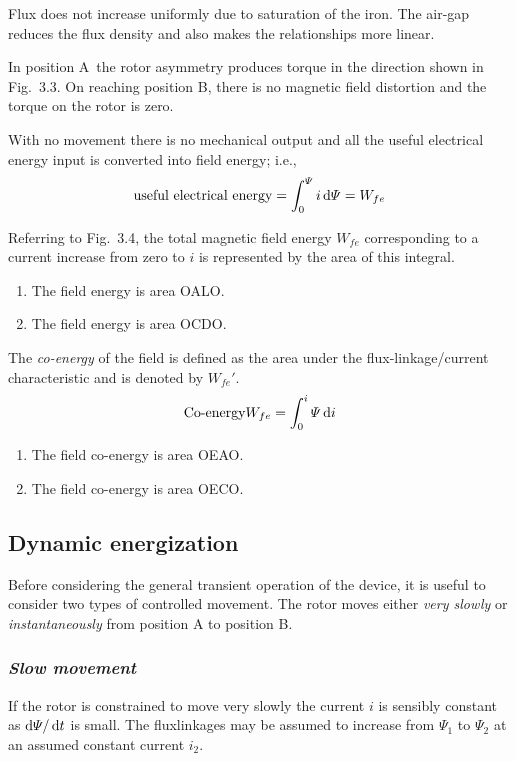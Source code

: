 \documentclass[a4paper,numbers=noenddot,12pt]{scrbook}
\begin{document}
Flux does not increase uniformly due to saturation of the iron. The air-gap reduces the flux density and also makes the relationships more linear.

In position A\ the rotor asymmetry produces torque in the direction shown in Fig.\ 3.3. On reaching position B, there is no magnetic field distortion and the torque on the rotor is zero.

With no movement there is no mechanical output and all the useful electrical energy input is converted into field energy; i.e.,
\begin{equation}
    \text{useful electrical energy} = \int_0^{\varPsi} i \dif \varPsi = W_{fe}
    \label{eq:Eq3.13}
\end{equation}

Referring to Fig.\ 3.4, the total magnetic field energy $W_{fe}$ corresponding to a current increase from zero to $i$ is represented by the area of this integral.
\begin{enumerate}[label={Position \Alph*:},leftmargin=3cm]
    \item The field energy is area OALO.\@
    \item The field energy is area OCDO.\@
\end{enumerate}

The \textit{co-energy} of the field is defined as the area under the flux-linkage/current characteristic and is denoted by $W_{fe}'$.
\begin{equation}
    \text{Co-energy} W_{fe} = \int_0^i \varPsi \dif i
    \label{eq:Eq3.14}
\end{equation}

\begin{enumerate}[label={Position \Alph*:},leftmargin=3cm]
    \item The field co-energy is area OEAO.\@
    \item The field co-energy is area OECO.\@
\end{enumerate}

\subsection{Dynamic energization}
Before considering the general transient operation of the device, it is useful to consider two types of controlled movement. The rotor moves either \textit{very slowly} or \textit{instantaneously} from position A to position B. 
\subsubsection{\textit{Slow movement}}
If the rotor is constrained to move very slowly the current $i$ is sensibly constant as $\dif \varPsi / \dif t$ is small. The flux­linkages may be assumed to increase from $\varPsi_1$ to $\varPsi_2$ at an assumed constant current $i_2$.
\end{document}
